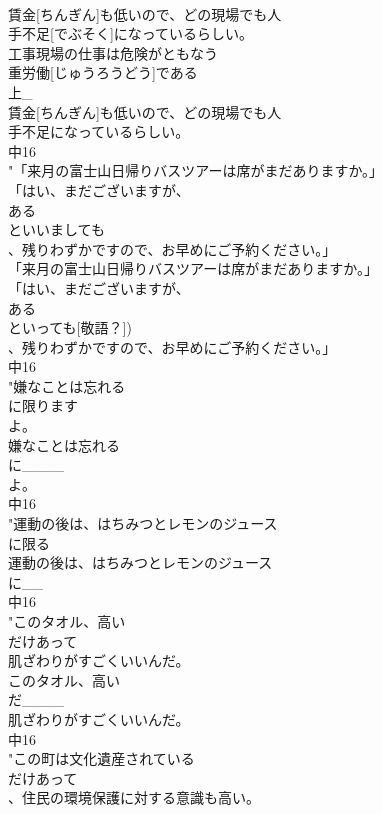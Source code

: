 \documentclass[8pt]{extreport}
\begin{document}
\begin{CJK}{UTF8}{min}
\\	賃金[ちんぎん]も低いので、どの現場でも人
\\	手不足[でぶそく]になっているらしい。
\\	工事現場の仕事は危険がともなう
\\	重労働[じゅうろうどう]である
\\	上_
\\	賃金[ちんぎん]も低いので、どの現場でも人
\\	手不足になっているらしい。
\\	中16
\\	"「来月の富士山日帰りバスツアーは席がまだありますか。」
\\	「はい、まだございますが、
\\	ある
\\	といいましても
\\	、残りわずかですので、お早めにご予約ください。」
\\	「来月の富士山日帰りバスツアーは席がまだありますか。」
\\	「はい、まだございますが、
\\	ある
\\	といっても[敬語？])
\\	、残りわずかですので、お早めにご予約ください。」
\\	中16
\\	"嫌なことは忘れる
\\	に限ります
\\	よ。
\\	嫌なことは忘れる
\\	に____
\\	よ。
\\	中16
\\	"運動の後は、はちみつとレモンのジュース
\\	に限る
\\	運動の後は、はちみつとレモンのジュース
\\	に__
\\	中16
\\	"このタオル、高い
\\	だけあって
\\	肌ざわりがすごくいいんだ。
\\	このタオル、高い
\\	だ____
\\	肌ざわりがすごくいいんだ。
\\	中16
\\	"この町は文化遺産されている
\\	だけあって
\\	、住民の環境保護に対する意識も高い。

\end{CJK}
\end{document}
